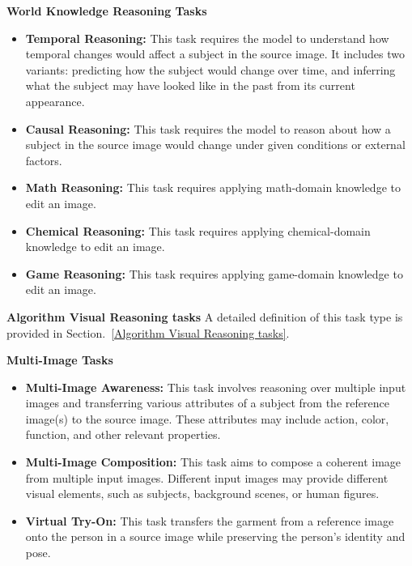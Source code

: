 \textbf{World Knowledge Reasoning Tasks}
\begin{itemize}[leftmargin=2.2em, labelsep=0.4em, itemsep=2pt]
    \item \textbf{Temporal Reasoning:} This task requires the model to understand how temporal changes would affect a subject in the source image. It includes two variants: predicting how the subject would change over time, and inferring what the subject may have looked like in the past from its current appearance. 
    \item \textbf{Causal Reasoning: } This task requires the model to reason about how a subject in the source image would change under given conditions or external factors.
    \item \textbf{Math Reasoning: } This task requires applying math-domain knowledge to edit an image.
    \item \textbf{Chemical Reasoning: }  This task requires applying chemical-domain knowledge to edit an image.
    \item \textbf{Game Reasoning: } This task requires applying game-domain knowledge to edit an image.
\end{itemize}


\textbf{Algorithm Visual Reasoning tasks}
A detailed definition of this task type is provided in Section.~\ref{Algorithm Visual Reasoning tasks}.

\textbf{Multi-Image Tasks}
\begin{itemize}[leftmargin=2.2em, labelsep=0.4em, itemsep=2pt]
    \item \textbf{Multi-Image Awareness:}  This task involves reasoning over multiple input images and transferring various attributes of a subject from the reference image(s) to the source image. These attributes may include action, color, function, and other relevant properties. 
    \item \textbf{Multi-Image Composition: } This task aims to compose a coherent image from multiple input images. Different input images may provide different visual elements, such as subjects, background scenes, or human figures.
    \item \textbf{Virtual Try-On:} This task transfers the garment from a reference image onto the person in a source image while preserving the person's identity and pose.
\end{itemize}


